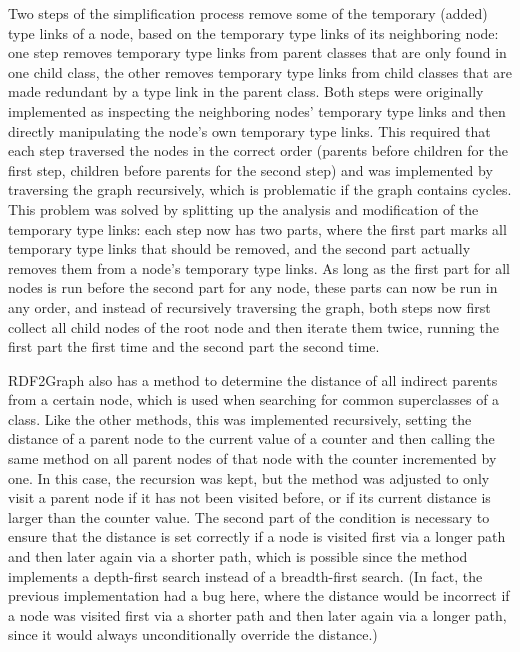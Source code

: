 Two steps of the simplification process %
remove some of the temporary (added) type links of a node,
based on the temporary type links of its neighboring node:
one step removes temporary type links from parent classes that are only found in one child class,
the other removes temporary type links from child classes that are made redundant by a type link in the parent class.
Both steps were originally implemented as inspecting the neighboring nodes’ temporary type links
and then directly manipulating the node’s own temporary type links.
This required that each step traversed the nodes in the correct order
(parents before children for the first step,
children before parents for the second step)
and was implemented by traversing the graph recursively,
which is problematic if the graph contains cycles.
This problem was solved by splitting up the analysis and modification of the temporary type links:
each step now has two parts,
where the first part marks all temporary type links that should be removed,
and the second part actually removes them from a node’s temporary type links.
As long as the first part for all nodes is run before the second part for any node,
these parts can now be run in any order,
and instead of recursively traversing the graph,
both steps now first collect all child nodes of the root node
and then iterate them twice,
running the first part the first time and the second part the second time.

RDF2Graph also has a method to determine the distance of all indirect parents from a certain node,
which is used when searching for common superclasses of a class.
Like the other methods, this was implemented recursively,
setting the distance of a parent node to the current value of a counter
and then calling the same method on all parent nodes of that node with the counter incremented by one.
In this case, the recursion was kept,
but the method was adjusted to only visit a parent node
if it has not been visited before, or if its current distance is larger than the counter value.
The second part of the condition is necessary to ensure that the distance is set correctly
if a node is visited first via a longer path and then later again via a shorter path,
which is possible since the method implements a depth-first search instead of a breadth-first search.
(In fact, the previous implementation had a bug here,
where the distance would be incorrect if a node was visited first via a shorter path and then later again via a longer path,
since it would always unconditionally override the distance.)

